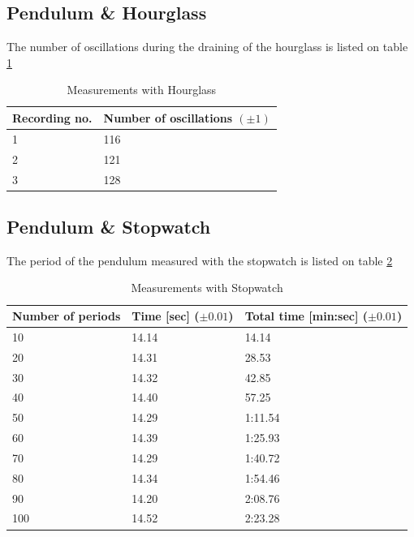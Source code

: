 \documentclass[%
 reprint,
 amsmath,amssymb,
 aps,
]{revtex4-1}
\begin{document}
	\subsection{Pendulum \& Hourglass}

    The number of oscillations during the draining of the hourglass is listed on table \ref{tab:hourglass}

	\begin{table}[h] %
        \center
        \caption{Measurements with Hourglass}
        \label{tab:hourglass}
        \begin{tabular}{| l | l |}
            \hline
            Recording no. & Number of oscillations $(\pm 1)$\\ \hline
            1 & 116 \\ \hline
            2 & 121 \\ \hline
            3 & 128 \\ \hline
        \end{tabular}
	\end{table}

	\subsection{Pendulum \& Stopwatch}

    The period of the pendulum measured with the stopwatch is listed on table \ref{tab:stopwatch}

	\begin{table}[h] %
        \center
        \caption{Measurements with Stopwatch}
        \label{tab:stopwatch}
	    \begin{tabular}{| p{1.5cm} | p{2cm} | p{2cm} |}
		    \hline
		    Number of periods & Time [sec] ($\pm 0.01$) & Total time [min:sec] ($\pm 0.01$)\\ \hline
		    10 & 14.14 & 14.14 \\ \hline
		    20 & 14.31 & 28.53 \\ \hline
		    30 & 14.32 & 42.85 \\ \hline
		    40 & 14.40 & 57.25 \\ \hline
		    50 & 14.29 & 1:11.54 \\ \hline
		    60 & 14.39 & 1:25.93 \\ \hline
		    70 & 14.29 & 1:40.72 \\ \hline
		    80 & 14.34 & 1:54.46 \\ \hline
		    90 & 14.20 & 2:08.76 \\ \hline
		    100 & 14.52 & 2:23.28 \\ \hline
        \end{tabular}
    \end{table}
    
\end{document}
